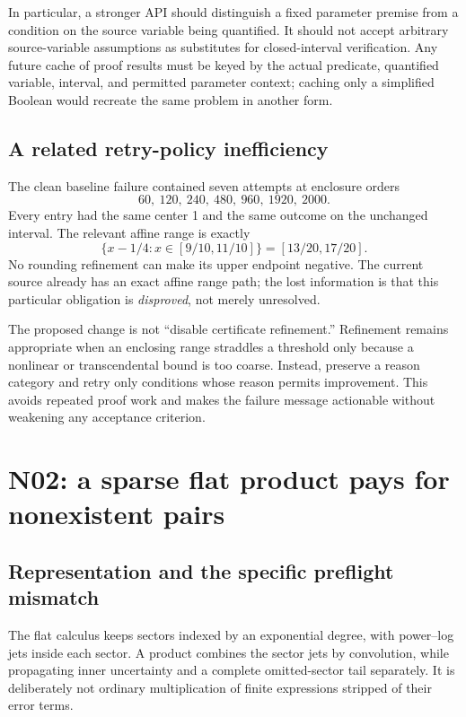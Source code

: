 \documentclass[11pt,a4paper]{article}
\newcommand{\code}[1]{\texttt{\detokenize{#1}}}
\begin{document}
In particular, a stronger API should distinguish a fixed parameter premise from a condition on the source variable being quantified. It should not accept arbitrary source-variable assumptions as substitutes for closed-interval verification. Any future cache of proof results must be keyed by the actual predicate, quantified variable, interval, and permitted parameter context; caching only a simplified Boolean would recreate the same problem in another form.

\subsection{A related retry-policy inefficiency}
The clean baseline failure contained seven attempts at enclosure orders
\[
 60,\ 120,\ 240,\ 480,\ 960,\ 1920,\ 2000.
\]
Every entry had the same center 1 and the same \code{OutsideBranch} outcome on the unchanged interval. The relevant affine range is exactly
\begin{equation}\label{eq:range-invalid}
 \{x-1/4:x\in[9/10,11/10]\}=[13/20,17/20].
\end{equation}
No rounding refinement can make its upper endpoint negative. The current source already has an exact affine range path; the lost information is that this particular obligation is \emph{disproved}, not merely unresolved.\cite{cert}

The proposed change is not ``disable certificate refinement.'' Refinement remains appropriate when an enclosing range straddles a threshold only because a nonlinear or transcendental bound is too coarse. Instead, preserve a reason category and retry only conditions whose reason permits improvement. This avoids repeated proof work and makes the failure message actionable without weakening any acceptance criterion.

\section{N02: a sparse flat product pays for nonexistent pairs}
\label{sec:flat}
\subsection{Representation and the specific preflight mismatch}
The flat calculus keeps sectors indexed by an exponential degree, with power--log jets inside each sector. A product combines the sector jets by convolution, while propagating inner uncertainty and a complete omitted-sector tail separately. It is deliberately not ordinary multiplication of finite expressions stripped of their error terms.\cite{flat}
\end{document}
